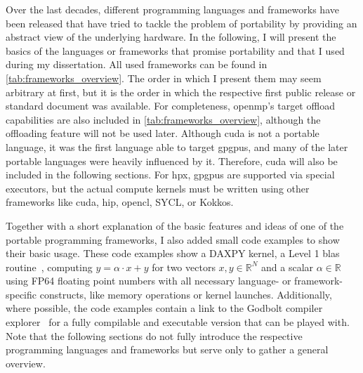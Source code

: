 \begin{table}[]
    \caption{%
    The list of the programming frameworks used in the remainder of this dissertation, including their supported target platforms. 
    Five out of the investigated eight programming frameworks promise to support all major hardware platforms, i.e., \glspl{cpu} and \glspl{gpu} from NVIDIA, \gls{amd}, and Intel. 
    Note that we do not make use of \gls{openmp}'s target offload feature and, therefore, later only investigate \gls{openmp} on \glspl{cpu}. 
    For \gls{hpx}, \glspl{gpu} are supported via special executors, but the actual compute kernels must be written using other frameworks like \gls{cuda}, \gls{hip}, SYCL, or Kokkos.
    }
    \label{tab:frameworks_overview}
\end{table}

Over the last decades, different programming languages and frameworks have been released that have tried to tackle the problem of portability by providing an abstract view of the underlying hardware. 
In the following, I will present the basics of the languages or frameworks that promise portability and that I used during my dissertation. 
All used frameworks can be found in \autoref{tab:frameworks_overview}. 
The order in which I present them may seem arbitrary at first, but it is the order in which the respective first public release or standard document was available. 
For completeness, \gls{openmp}'s target offload capabilities are also included in \autoref{tab:frameworks_overview}, although the offloading feature will not be used later. 
Although \gls{cuda} is not a portable language, it was the first language able to target \glspl{gpgpu}, and many of the later portable languages were heavily influenced by it. 
Therefore, \gls{cuda} will also be included in the following sections. 
For \gls{hpx}, \glspl{gpgpu} are supported via special executors, but the actual compute kernels must be written using other frameworks like \gls{cuda}, \gls{hip}, \gls{opencl}, SYCL, or Kokkos. 

Together with a short explanation of the basic features and ideas of one of the portable programming frameworks, I also added small code examples to show their basic usage. 
These code examples show a DAXPY kernel, a Level 1 \gls{blas} routine~\cite{blackford_updated_2002}, computing $y = \alpha \cdot x + y$ for two vectors $x, y \in \mathbb{R}^N$ and a scalar $\alpha \in \mathbb{R}$ using FP64 floating point numbers with all necessary language- or framework-specific constructs, like memory operations or kernel launches. 
Additionally, where possible, the code examples contain a link to the Godbolt compiler explorer~\cite{godbolt_compiler-explorercompiler-explorer_2025} for a fully compilable and executable version that can be played with. 
Note that the following sections do not fully introduce the respective programming languages and frameworks but serve only to gather a general overview. 

